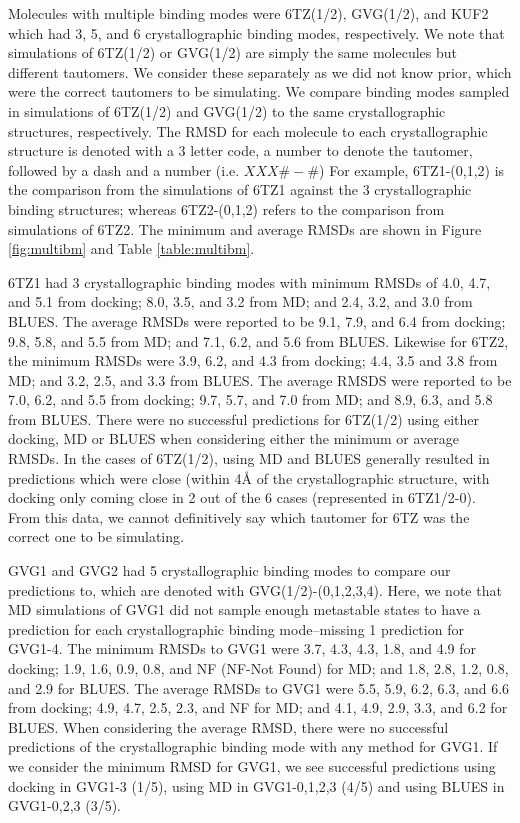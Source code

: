 Molecules with multiple binding modes were 6TZ(1/2), GVG(1/2), and KUF2 which had 3, 5, and 6 crystallographic binding modes, respectively.
We note that simulations of 6TZ(1/2) or GVG(1/2) are simply the same molecules but different tautomers.
We consider these separately as we did not know prior, which were the correct tautomers to be simulating.
We compare binding modes sampled in simulations of 6TZ(1/2) and GVG(1/2) to the same crystallographic structures, respectively.
The RMSD for each molecule to each crystallographic structure is denoted with a 3 letter code, a number to denote the tautomer, followed by a dash and a number (i.e. $XXX\#-\#$) 
For example, 6TZ1-(0,1,2) is the comparison from the simulations of 6TZ1 against the 3 crystallographic binding structures; whereas 6TZ2-(0,1,2) refers to the comparison from simulations of 6TZ2.
The minimum and average RMSDs are shown in Figure \ref{fig:multibm} and Table \ref{table:multibm}.

6TZ1 had 3 crystallographic binding modes with minimum RMSDs of 4.0, 4.7, and 5.1 from docking; 8.0, 3.5, and 3.2 from MD; and 2.4, 3.2, and 3.0 from BLUES.
The average RMSDs were reported to be 9.1, 7.9, and 6.4 from docking; 9.8, 5.8, and 5.5 from MD; and 7.1, 6.2, and 5.6 from BLUES.
Likewise for 6TZ2, the minimum RMSDs were 3.9, 6.2, and 4.3 from docking; 4.4, 3.5 and 3.8 from MD; and 3.2, 2.5, and 3.3 from BLUES.
The average RMSDS were reported to be 7.0, 6.2, and 5.5 from docking; 9.7, 5.7, and 7.0 from MD; and 8.9, 6.3, and 5.8 from BLUES.
There were no successful predictions for 6TZ(1/2) using either docking, MD or BLUES when considering either the minimum or average RMSDs.
In the cases of 6TZ(1/2), using MD and BLUES generally resulted in predictions which were close (within 4{\AA} of the crystallographic structure, with docking only coming close in 2 out of the 6 cases (represented in 6TZ1/2-0).
From this data, we cannot definitively say which tautomer for 6TZ was the correct one to be simulating.

GVG1 and GVG2 had 5 crystallographic binding modes to compare our predictions to, which are denoted with GVG(1/2)-(0,1,2,3,4).
Here, we note that MD simulations of GVG1 did not sample enough metastable states to have a prediction for each crystallographic binding mode--missing 1 prediction for GVG1-4.
The minimum RMSDs to GVG1 were 3.7, 4.3, 4.3, 1.8, and 4.9 for docking; 1.9, 1.6, 0.9, 0.8, and NF (NF-Not Found) for MD; and 1.8, 2.8, 1.2, 0.8, and 2.9 for BLUES.
The average RMSDs to GVG1 were 5.5, 5.9, 6.2, 6.3, and 6.6 from docking; 4.9, 4.7, 2.5, 2.3, and NF for MD; and 4.1, 4.9, 2.9, 3.3, and 6.2 for BLUES.
When considering the average RMSD, there were no successful predictions of the crystallographic binding mode with any method for GVG1.
If we consider the minimum RMSD for GVG1, we see successful predictions using docking in GVG1-3 (1/5), using MD in GVG1-0,1,2,3 (4/5) and using BLUES in GVG1-0,2,3 (3/5).

